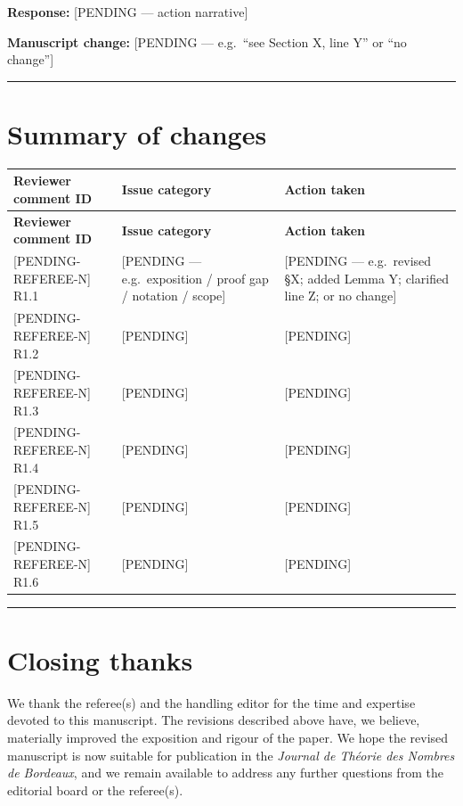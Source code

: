 \documentclass[11pt]{amsart}
\begin{document}
\noindent\textbf{Response:} [PENDING --- action narrative]

\noindent\textbf{Manuscript change:} [PENDING --- e.g.\ ``see Section X, line Y'' or ``no change'']

\bigskip
\hrule
\bigskip

\section*{Summary of changes}

\begin{longtable}{@{}p{} p{} p{}@{}}
\toprule
\textbf{Reviewer comment ID} & \textbf{Issue category} & \textbf{Action taken} \\
\midrule
\endfirsthead
\toprule
\textbf{Reviewer comment ID} & \textbf{Issue category} & \textbf{Action taken} \\
\midrule
\endhead
\bottomrule
\endlastfoot
{}[PENDING-REFEREE-N] R1.1 & {}[PENDING --- e.g.\ exposition / proof gap / notation / scope] & {}[PENDING --- e.g.\ revised \S X; added Lemma Y; clarified line Z; or no change] \\
{}[PENDING-REFEREE-N] R1.2 & {}[PENDING] & {}[PENDING] \\
{}[PENDING-REFEREE-N] R1.3 & {}[PENDING] & {}[PENDING] \\
{}[PENDING-REFEREE-N] R1.4 & {}[PENDING] & {}[PENDING] \\
{}[PENDING-REFEREE-N] R1.5 & {}[PENDING] & {}[PENDING] \\
{}[PENDING-REFEREE-N] R1.6 & {}[PENDING] & {}[PENDING] \\
\end{longtable}

\bigskip
\hrule
\bigskip

\section*{Closing thanks}

\noindent
We thank the referee(s) and the handling editor for the time and
expertise devoted to this manuscript.  The revisions described above
have, we believe, materially improved the exposition and rigour of
the paper.  We hope the revised manuscript is now suitable for
publication in the \emph{Journal de Th\'eorie des Nombres de
Bordeaux}, and we remain available to address any further questions
from the editorial board or the referee(s).
\end{document}
